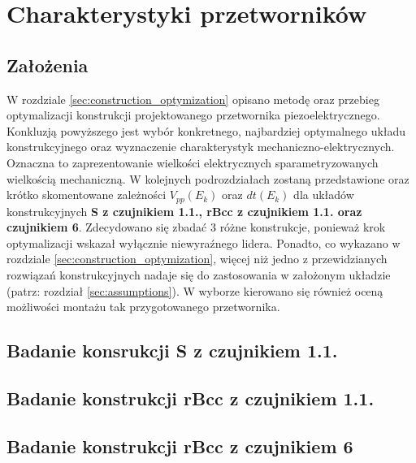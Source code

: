 \chapter{Charakterystyki przetworników}
\label{sec:sensor_characteristic}

\section{Założenia}
\label{sec:sensor_characteristic_assumptions}

W rozdziale \ref{sec:construction_optymization} opisano metodę oraz przebieg optymalizacji 
konstrukcji projektowanego przetwornika piezoelektrycznego. Konkluzją powyższego jest wybór
konkretnego, najbardziej optymalnego układu konstrukcyjnego oraz wyznaczenie charakterystyk
mechaniczno-elektrycznych. Oznaczna to zaprezentowanie wielkości elektrycznych 
sparametryzowanych wielkością mechaniczną. W kolejnych podrozdziałach zostaną przedstawione
oraz krótko skomentowane zależności $V_{pp}(E_k)$ oraz $dt(E_k)$ dla układów konstrukcyjnych
\textbf{S z czujnikiem 1.1., rBcc z czujnikiem 1.1. oraz czujnikiem 6}. Zdecydowano się 
zbadać 3 różne konstrukcje, ponieważ krok optymalizacji wskazał wyłącznie niewyraźnego
lidera. Ponadto, co wykazano w rozdziale \ref{sec:construction_optymization}, więcej niż
jedno z przewidzianych rozwiązań konstrukcyjnych nadaje się do zastosowania w założonym
układzie (patrz: rozdział \ref{sec:assumptions}). W wyborze kierowano się również
oceną możliwości montażu tak przygotowanego przetwornika.

\section{Badanie konsrukcji S z czujnikiem 1.1.}
\label{sec:sensor_characteristic_11S}

\section{Badanie konstrukcji rBcc z czujnikiem 1.1.}
\label{sec:sensor_characteristic_11rBcc}

\section{Badanie konstrukcji rBcc z czujnikiem 6}
\label{sec:sensor_characteristic_6rBcc}

